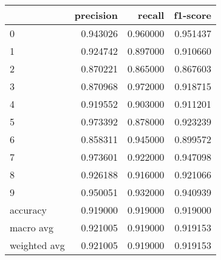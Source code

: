 \begin{tabular}{lrrr}
\toprule
 & precision & recall & f1-score \\
\midrule
0 & 0.943026 & 0.960000 & 0.951437 \\
1 & 0.924742 & 0.897000 & 0.910660 \\
2 & 0.870221 & 0.865000 & 0.867603 \\
3 & 0.870968 & 0.972000 & 0.918715 \\
4 & 0.919552 & 0.903000 & 0.911201 \\
5 & 0.973392 & 0.878000 & 0.923239 \\
6 & 0.858311 & 0.945000 & 0.899572 \\
7 & 0.973601 & 0.922000 & 0.947098 \\
8 & 0.926188 & 0.916000 & 0.921066 \\
9 & 0.950051 & 0.932000 & 0.940939 \\
accuracy & 0.919000 & 0.919000 & 0.919000 \\
macro avg & 0.921005 & 0.919000 & 0.919153 \\
weighted avg & 0.921005 & 0.919000 & 0.919153 \\
\bottomrule
\end{tabular}
